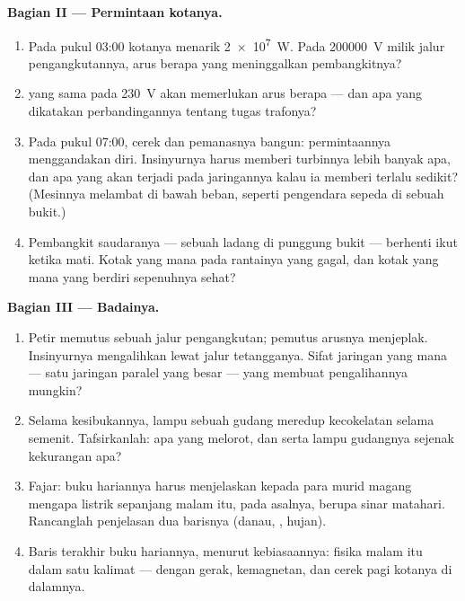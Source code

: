 \begin{problem}
\medskip\noindent\textbf{Bagian II --- Permintaan kotanya.}
\begin{enumerate}[resume]
  \item Pada pukul 03:00 kotanya menarik \qty{2e7}{W}. Pada
        \qty{200000}{V} milik jalur pengangkutannya, arus berapa yang
        meninggalkan pembangkitnya?
  \item {} yang sama pada \qty{230}{V} akan memerlukan arus berapa
        --- dan apa yang dikatakan perbandingannya tentang tugas
        trafonya?
  \item Pada pukul 07:00, cerek dan pemanasnya bangun: permintaannya
        menggandakan diri. Insinyurnya harus memberi turbinnya lebih
        banyak apa, dan apa yang akan terjadi pada 
        jaringannya kalau ia memberi terlalu sedikit? (Mesinnya
        melambat di bawah beban, seperti pengendara sepeda di sebuah
        bukit.)
  \item Pembangkit saudaranya --- sebuah ladang  di punggung
        bukit --- berhenti ikut ketika  mati. Kotak yang mana
        pada rantainya yang gagal, dan kotak yang mana yang berdiri
        sepenuhnya sehat?
\end{enumerate}

\medskip\noindent\textbf{Bagian III --- Badainya.}
\begin{enumerate}[resume]
  \item Petir memutus sebuah jalur pengangkutan; pemutus arusnya
        menjeplak. Insinyurnya mengalihkan  lewat jalur
        tetangganya. Sifat jaringan yang mana --- satu jaringan
        paralel yang besar --- yang membuat pengalihannya mungkin?
  \item Selama kesibukannya, lampu sebuah gudang meredup kecokelatan
        selama semenit. Tafsirkanlah: apa yang melorot, dan 
        serta lampu gudangnya sejenak kekurangan apa?
  \item Fajar: buku hariannya harus menjelaskan kepada para murid
        magang mengapa listrik sepanjang malam itu, pada asalnya,
        berupa sinar matahari. Rancanglah penjelasan dua barisnya
        (danau, , hujan).
  \item Baris terakhir buku hariannya, menurut kebiasaannya: fisika
        malam itu dalam satu kalimat --- dengan gerak, kemagnetan, dan
        cerek pagi kotanya di dalamnya.
\end{enumerate}
\end{problem}
